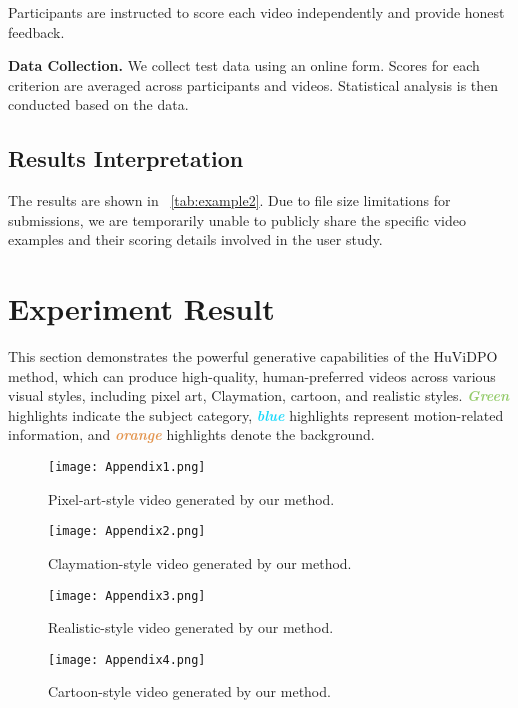 Participants are instructed to score each video independently and provide honest feedback.

\textbf{Data Collection.} We collect test data using an online form. Scores for each criterion are averaged across participants and videos. Statistical analysis is then conducted based on the data.

\subsection{Results Interpretation}
The results are shown in ~\cref{tab:example2}. Due to file size limitations for submissions, we are temporarily unable to publicly share the specific video examples and their scoring details involved in the user study.

\section{Experiment Result}

This section demonstrates the powerful generative capabilities of the HuViDPO method, which can produce high-quality, human-preferred videos across various visual styles, including pixel art, Claymation, cartoon, and realistic styles. \textcolor[HTML]{94CB6B}{\textit{\textbf{Green}}} highlights indicate the subject category, \textcolor[HTML]{18D8FA}{\textit{\textbf{blue}}} highlights represent motion-related information, and \textcolor[HTML]{E3954F}{\textit{\textbf{orange}}} highlights denote the background.

\begin{figure*}[htbp]
    \centering
    \texttt{[image: Appendix1.png]}
    \caption{Pixel-art-style video generated by our method.}
\end{figure*}

\begin{figure*}[htbp]
    \centering
    \texttt{[image: Appendix2.png]}
    \caption{Claymation-style video generated by our method.}
\end{figure*}

\begin{figure*}[htbp]
    \centering
    \texttt{[image: Appendix3.png]}
    \caption{Realistic-style video generated by our method.}
\end{figure*}

\begin{figure*}[htbp]
    \centering
    \texttt{[image: Appendix4.png]}
    \caption{Cartoon-style video generated by our method.}
\end{figure*}

